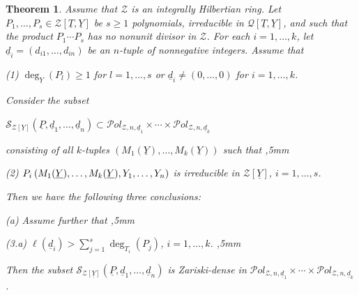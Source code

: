 \documentclass[11pt,a4paper,reqno]{amsart}
\newtheorem{thm}{Theorem}[section]
\theoremstyle{definition}
\begin{document}
\begin{thm} \label{thm:main3}
Assume that ${\mathcal Z}$ is an integrally Hilbertian ring.
Let $P_1,\ldots,P_s \in {\mathcal Z}[\underline{T},\underline{Y}]$ be $s\geq 1$ polynomials, irreducible in $\mathcal{Q}[\underline{T},\underline{Y}]$, and such that the product $P_1\cdots P_s$ has no nonunit divisor in ${\mathcal Z}$.
For each $i=1,\ldots,k$, let ${\underline d}_i=(d_{i1},\ldots,d_{in})$ be an $n$-tuple of nonnegative integers. Assume that \vskip 1mm

\noindent
{\rm (1)} $\deg_{\underline Y}(P_l) \geq 1$ for $l=1,\ldots,s$ or ${\underline d}_i \not= (0,\ldots,0)$ for $i=1,\ldots,k$. 
\vskip 2mm 

\noindent
Consider the subset
\vskip 1mm

\centerline{${\mathcal S}_{{\mathcal Z}[\underline Y]}(\underline P,{\underline d}_1,\ldots,{\underline d}_n) \subset {\mathcal P}ol_{{\mathcal Z},n,\underline{d}_1} \times \cdots \times {\mathcal P}ol_{{\mathcal Z},n,\underline{d}_k}$} 
\vskip 2mm

\noindent
consisting of all $k$-tuples $(M_1(\underline Y), \ldots, M_k(\underline Y))$ such that   ,5mm

\noindent
{\rm (2)} \hskip 10mm $P_i\hskip 2pt (M_1(\underline Y), \ldots, M_k(\underline Y),Y_1, \ldots, Y_n)$
is irreducible in ${\mathcal Z}[\underline Y]$, $i=1,\ldots, s$.

\vskip 2mm

\noindent
Then we have the following three conclusions:
\vskip 1mm


\noindent
{\rm (a)} Assume further that
,5mm

\noindent
{\rm (3.a)} \hskip 25mm $\ell({\underline d}_i)> \sum_{j=1}^s \deg_{T_i}(P_j)$, \hskip 3mm $i=1,\ldots,k$.
,5mm

\noindent
Then the subset ${\mathcal S}_{{\mathcal Z}[\underline Y]}(\underline P,{\underline d}_1,\ldots,{\underline d}_n)$ is Zariski-dense in ${\mathcal P}ol_{{\mathcal Z},n,\underline{d}_1} \times \cdots \times {\mathcal P}ol_{{\mathcal Z},n,\underline{d}_k}$.




\vskip 2mm


\end{thm}
\end{document}
